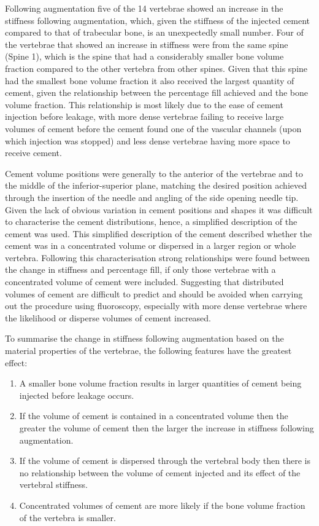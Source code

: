 Following augmentation five of the 14 vertebrae showed an increase in the
stiffness following augmentation, which, given the stiffness of the injected
cement compared to that of trabecular bone, is an unexpectedly small number.
Four of the vertebrae that showed an increase in stiffness were from the same
spine (Spine 1), which is the spine that had a considerably smaller bone volume
fraction compared to the other vertebra from other spines.  Given that this
spine had the smallest bone volume fraction it also received the largest
quantity of cement, given the relationship between the percentage fill achieved
and the bone volume fraction.  This relationship is most likely due to the ease
of cement injection before leakage, with more dense vertebrae failing to
receive large volumes of cement before the cement found one of the vascular
channels (upon which injection was stopped) and less dense vertebrae having
more space to receive cement.

Cement volume positions were generally to the anterior of the vertebrae and to
the middle of the inferior-superior plane, matching the desired position
achieved through the insertion of the needle and angling of the side opening
needle tip.  Given the lack of obvious variation in cement positions and shapes
it was difficult to characterise the cement distributions, hence, a simplified
description of the cement was used.  This simplified description of the cement
described whether the cement was in a concentrated volume or dispersed in a
larger region or whole vertebra.  Following this characterisation strong
relationships were found between the change in stiffness and percentage fill,
if only those vertebrae with a concentrated volume of cement were included.
Suggesting that distributed volumes of cement are difficult to predict and
should be avoided when carrying out the procedure using fluoroscopy, especially
with more dense vertebrae where the likelihood or disperse volumes of cement
increased.


To summarise the change in stiffness following augmentation based on the
material properties of the vertebrae, the following features have the greatest
effect:
\begin{enumerate} 
\item A smaller bone volume fraction results in larger quantities of cement
    being injected before leakage occurs.  
\item If the volume of cement is contained in a concentrated volume then the
    greater the volume of cement then the larger the increase in stiffness
    following augmentation.  
\item If the volume of cement is dispersed through the
    vertebral body then there is no relationship between the volume of cement
    injected and its effect of the vertebral stiffness.
\item Concentrated volumes of cement are more likely if the bone volume
fraction of the vertebra is smaller.
\end{enumerate}

